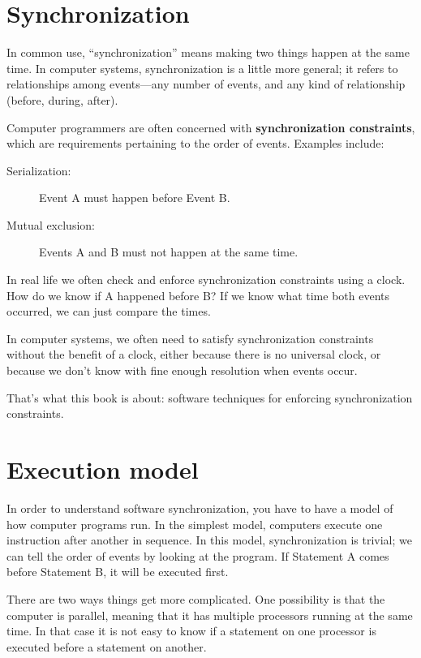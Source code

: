 
\section{Synchronization}
\label{synch}

In common use, ``synchronization'' means making two things happen
at the same time.  In computer systems, synchronization is a little
more general; it refers to relationships among events---any number
of events, and any kind of relationship (before, during, after).

Computer programmers are often concerned with {\bf synchronization
constraints}, which are requirements pertaining to the order of
events.  Examples include:

\begin{description}

\item[Serialization:] Event A must happen before Event B.

\item[Mutual exclusion:] Events A and B must not happen at the same time.

\end{description}

In real life we often check and enforce synchronization constraints 
using a clock.  How do we know if A happened before B?  If we
know what time both events occurred, we can just compare the times.

In computer systems, we often need to satisfy synchronization
constraints without the benefit of a clock, either because there
is no universal clock, or because we don't know with fine enough
resolution when events occur.

That's what this book is about: software techniques for enforcing
synchronization constraints.


\section {Execution model}

In order to understand software synchronization, you have to
have a model of how computer programs run.  In the simplest
model, computers execute one instruction after another in
sequence.  In this model, synchronization is trivial; we can
tell the order of events by looking at the program.  If Statement
A comes before Statement B, it will be executed first.

There are two ways things get more complicated.  One possibility
is that the computer is parallel, meaning that it has multiple
processors running at the same time.  In that case it is not easy
to know if a statement on one processor is executed before a
statement on another.

